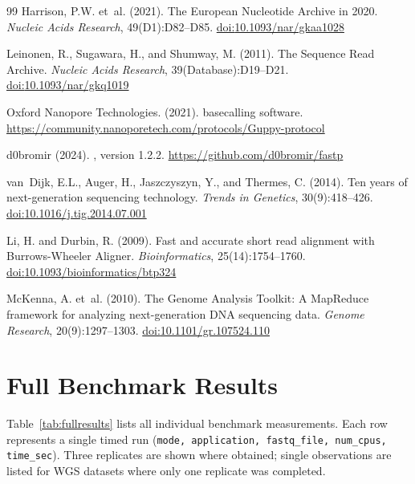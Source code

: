 \documentclass[a4paper,12pt]{article}
\newcommand{\doi}[1]{\href{https://doi.org/#1}{doi:{#1}}}
\begin{document}
\begin{thebibliography}{99}
Harrison, P.W. et~al. (2021).
\newblock The {European Nucleotide Archive} in 2020.
\newblock \textit{Nucleic Acids Research}, 49(D1):D82--D85.
\newblock \doi{10.1093/nar/gkaa1028}

Leinonen, R., Sugawara, H., and Shumway, M. (2011).
\newblock The {Sequence Read Archive}.
\newblock \textit{Nucleic Acids Research}, 39(Database):D19--D21.
\newblock \doi{10.1093/nar/gkq1019}

Oxford Nanopore Technologies. (2021).
 basecalling software.
\newblock \url{https://community.nanoporetech.com/protocols/Guppy-protocol}

d0bromir (2024).
, version 1.2.2.
\newblock \url{https://github.com/d0bromir/fastp}

van~Dijk, E.L., Auger, H., Jaszczyszyn, Y., and Thermes, C. (2014).
\newblock Ten years of next-generation sequencing technology.
\newblock \textit{Trends in Genetics}, 30(9):418--426.
\newblock \doi{10.1016/j.tig.2014.07.001}

Li, H. and Durbin, R. (2009).
\newblock Fast and accurate short read alignment with {Burrows-Wheeler Aligner}.
\newblock \textit{Bioinformatics}, 25(14):1754--1760.
\newblock \doi{10.1093/bioinformatics/btp324}

McKenna, A. et~al. (2010).
\newblock The {Genome Analysis Toolkit}: A {MapReduce} framework for analyzing
  next-generation {DNA} sequencing data.
\newblock \textit{Genome Research}, 20(9):1297--1303.
\newblock \doi{10.1101/gr.107524.110}

\end{thebibliography}

\newpage
\appendix

\section{Full Benchmark Results}
\label{app:fullresults}

Table~\ref{tab:fullresults} lists all individual benchmark measurements.
Each row represents a single timed run (\texttt{mode, application, fastq\_file,
num\_cpus, time\_sec}).  Three replicates are shown where obtained; single
observations are listed for WGS datasets where only one replicate was completed.
\end{document}
